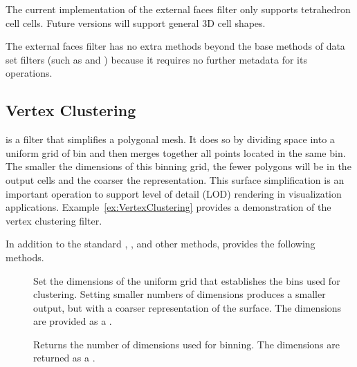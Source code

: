 \begin{commonerrors}
  The current implementation of the external faces filter only supports
  tetrahedron cell cells. Future versions will support general 3D cell
  shapes. 
\end{commonerrors}

The external faces filter has no extra methods beyond the base methods of
data set filters (such as  and
) because it requires no further metadata for
its operations.


\subsection{Vertex Clustering}


 is a filter that simplifies a polygonal mesh.
It does so by dividing space into a uniform grid of bin and then merges
together all points located in the same bin. The smaller the dimensions of
this binning grid, the fewer polygons will be in the output cells and the
coarser the representation. This surface simplification is an important
operation to support level of detail (LOD)
rendering in visualization applications. Example~\ref{ex:VertexClustering}
provides a demonstration of the vertex clustering filter.

In addition to the standard ,
, and other methods,
 provides the following methods.

\begin{description}
\item[] Set the dimensions of the uniform
  grid that establishes the bins used for clustering. Setting smaller
  numbers of dimensions produces a smaller output, but with a coarser
  representation of the surface. The dimensions are provided as a
  .
\item[] Returns the number of dimensions
  used for binning. The dimensions are returned as a .
\end{description}


